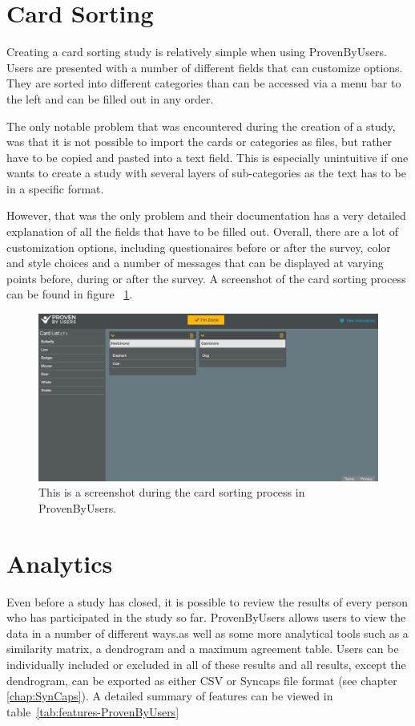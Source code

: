 \section{Card Sorting}
Creating a card sorting study is relatively simple when using ProvenByUsers.
 Users are presented with a number of different fields that can customize 
 options. They are sorted into different categories than can be accessed via a 
 menu bar to the left and can be filled out in any order. 

The only notable problem that was encountered during the creation of a study, was 
that it is not possible to import the cards or categories as files, but rather 
have to be copied and pasted into a text field. This is especially unintuitive 
if one wants to create a study with several layers of sub-categories as the 
text has to be in a specific format. 

However, that was the only problem and their documentation has a very detailed 
explanation of all the fields that have to be filled out. Overall, there are a 
lot of customization options, including questionaires before or after the 
survey, color and style choices and a number of messages that can be displayed 
at varying points before, during or after the survey. A screenshot of the card
sorting process can be found in figure ~\ref{fig:ProvenByUsers2}.

\begin{figure}[tp] 
\centering
\includegraphics[keepaspectratio,width=\linewidth,height=\halfh]{images/provenbyusers-sorting.png}
\caption[ProvenByUsers Card Sorting] { This is a screenshot during the card
sorting process in ProvenByUsers.
 }
\label{fig:ProvenByUsers2}
\end{figure}


\section{Analytics}
Even before a study has closed, it is possible to review the results of every 
person who has participated in the study so far. ProvenByUsers allows users to 
view the data in a number of different ways.as well as some more analytical 
tools such as a similarity matrix, a dendrogram and a maximum agreement table. 
Users can be individually included or excluded in all of these results and all 
results, except the dendrogram, can be exported as either CSV or Syncaps
file format (see chapter \ref{chap:SynCaps}). A detailed summary of features 
can be viewed in table~\ref{tab:features-ProvenByUsers}

